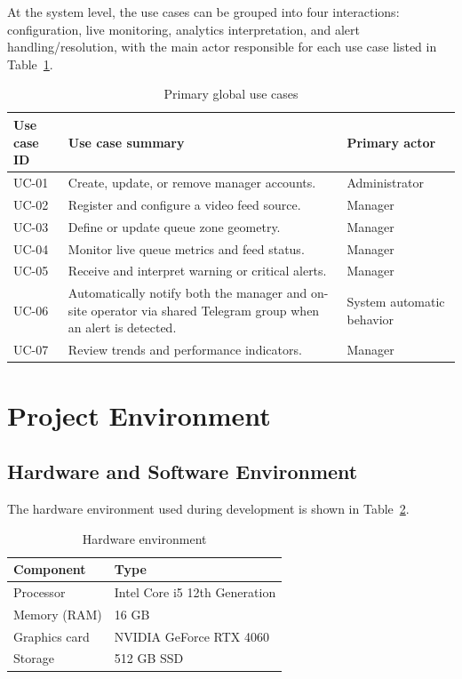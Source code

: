 At the system level, the use cases can be grouped into four interactions: configuration, live monitoring, analytics interpretation, and alert handling/resolution, with the main actor responsible for each use case listed in Table~\ref{tab:global_use_cases}.
\begin{table}[!htbp]
    \centering
    \begin{tabularx}{\textwidth}{|l|X|l|}
        \hline
        Use case ID & Use case summary & Primary actor \\ \hline
        UC-01 & Create, update, or remove manager accounts. & Administrator \\ \hline
        UC-02 & Register and configure a video feed source. & Manager \\ \hline
        UC-03 & Define or update queue zone geometry. & Manager \\ \hline
        UC-04 & Monitor live queue metrics and feed status. & Manager \\ \hline
        UC-05 & Receive and interpret warning or critical alerts. & Manager \\ \hline
        UC-06 & Automatically notify both the manager and on-site operator via shared Telegram group when an alert is detected. & System automatic behavior \\ \hline
        UC-07 & Review trends and performance indicators. & Manager \\ \hline
    \end{tabularx}
    \caption{Primary global use cases}
    \label{tab:global_use_cases}
\end{table}

\section{Project Environment}

\subsection{Hardware and Software Environment}
The hardware environment used during development is shown in Table~\ref{tab:hardware_environment}.
\begin{table}[H]
    \centering
    \begingroup\setlength{\tabcolsep}{4pt}\renewcommand{\arraystretch}{0.95}\small
    \begin{tabularx}{0.8\textwidth}{|l|X|}
        \hline
        Component & Type \\ \hline
        Processor & Intel Core i5 12th Generation \\ \hline
        Memory (RAM) & 16 GB \\ \hline
        Graphics card & NVIDIA GeForce RTX 4060 \\ \hline
        Storage & 512 GB SSD \\ \hline
        \end{tabularx}
        \caption{Hardware environment}
        \label{tab:hardware_environment}
        \endgroup
    \end{table}

